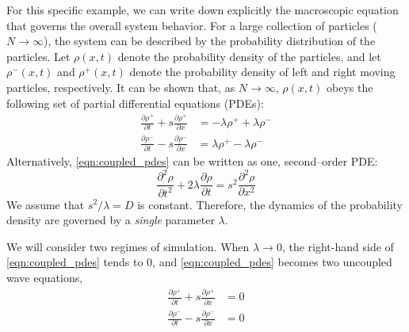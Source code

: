 \documentclass[prl, reprint, final, showkeys]{revtex4-1}
\begin{document}

For this specific example, we can write down explicitly the macroscopic equation that governs the overall system behavior.
%
For a large collection of particles ($N \rightarrow \infty$), the system can be described by the probability distribution of the particles.
%
Let $\rho(x, t)$ denote the probability density of the particles, and let $\rho^-(x, t)$ and $\rho^+(x, t)$ denote the probability density of left and right moving particles, respectively.
%
It can be shown that, as $N \rightarrow \infty$, $\rho(x, t)$ obeys the following set of partial differential equations (PDEs):
\begin{equation} \label{eqn:coupled_pdes}
\begin{aligned}
\frac{\partial \rho^+}{\partial t} + s \frac{\partial \rho^+}{\partial x} & = -\lambda \rho^+ +\lambda \rho^- \\
\frac{\partial \rho^-}{\partial t} - s \frac{\partial \rho^-}{\partial x} & = \lambda \rho^+ -\lambda \rho^- 
\end{aligned}
\end{equation}
%
Alternatively, \eqref{eqn:coupled_pdes} can be written as one, second--order PDE:
\begin{equation} \label{eq:second_order_pde}
\frac{\partial^2 \rho}{\partial t^2} + 2 \lambda \frac{\partial \rho}{\partial t} = s^2 \frac{\partial ^2 \rho}{\partial x^2}
\end{equation}
%
We assume that $s^2/\lambda = D$ is constant.
%
Therefore, the dynamics of the probability density are governed by a {\em single} parameter $\lambda$.


We will consider two regimes of simulation.
%
When $\lambda \rightarrow 0$, the right-hand side of \eqref{eqn:coupled_pdes} tends to 0, and \eqref{eqn:coupled_pdes} becomes two uncoupled wave equations,
\begin{equation}
\begin{aligned}
\frac{\partial \rho^+}{\partial t} + s \frac{\partial \rho^+}{\partial x} & = 0 \\
\frac{\partial \rho^-}{\partial t} - s \frac{\partial \rho^-}{\partial x} & = 0
\end{aligned}
\end{equation}
\end{document}
